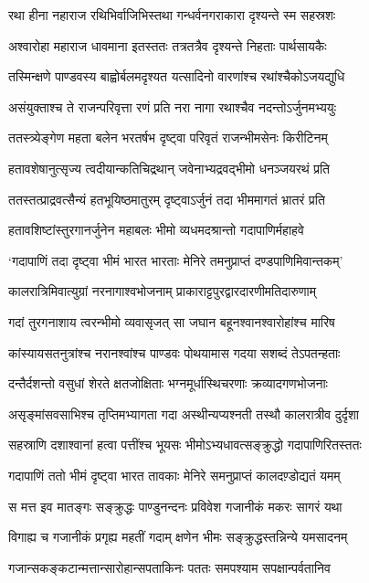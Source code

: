 \twolineshloka
{रथा हीना नहाराज रथिभिर्वाजिभिस्तथा}
{गन्धर्वनगराकारा दृश्यन्ते स्म सहस्रशः}


\twolineshloka
{अश्वारोहा महाराज धावमाना इतस्ततः}
{तत्रतत्रैव दृश्यन्ते निहताः पार्थसायकैः}


\twolineshloka
{तस्मिन्क्षणे पाण्डवस्य बाह्वोर्बलमदृश्यत}
{यत्सादिनो वारणांश्च रथांश्चैकोऽजयद्युधि}


\twolineshloka
{असंयुक्ताश्च ते राजन्परिवृत्ता रणं प्रति}
{नरा नागा रथाश्चैव नदन्तोऽर्जुनमभ्ययुः}


\twolineshloka
{ततस्त्र्येङ्गेण महता बलेन भरतर्षभ}
{दृष्ट्वा परिवृतं राजन्भीमसेनः किरीटिनम्}


\twolineshloka
{हतावशेषानुत्सृज्य त्वदीयान्कतिचिद्रथान्}
{जवेनाभ्यद्रवद्भीमो धनञ्जयरथं प्रति}


\twolineshloka
{ततस्तत्प्राद्रवत्सैन्यं हतभूयिष्ठमातुरम्}
{दृष्ट्वाऽर्जुनं तदा भीममागतं भ्रातरं प्रति}


\twolineshloka
{हतावशिष्टांस्तुरगानर्जुनेन महाबलः}
{भीमो व्यधमदश्रान्तो गदापाणिर्महाहवे}


\twolineshloka
{`गदापाणिं तदा दृष्ट्वा भीमं भारत भारताः}
{मेनिरे तमनुप्राप्तं दण्डपाणिमिवान्तकम्'}


\twolineshloka
{कालरात्रिमिवात्युग्रां नरनागाश्वभोजनाम्}
{प्राकाराट्टपुरद्वारदारणीमतिदारुणाम्}


\twolineshloka
{गदां तुरगनाशाय त्वरन्भीमो व्यवासृजत्}
{सा जघान बहूनश्वानश्वारोहांश्च मारिष}


\twolineshloka
{कांस्यायसतनुत्रांश्च नरानश्वांश्च पाण्डवः}
{पोथयामास गदया सशब्दं तेऽपतन्हताः}


\twolineshloka
{दन्तैर्दशन्तो वसुधां शेरते क्षतजोक्षिताः}
{भग्नमूर्धास्थिचरणाः क्रव्यादगणभोजनाः}


\twolineshloka
{असृङ्मांसवसाभिश्च तृप्तिमभ्यागता गदा}
{अस्थीन्यप्यश्नती तस्थौ कालरात्रीव दुर्दृशा}


\twolineshloka
{सहस्राणि दशाश्वानां हत्वा पत्तींश्च भूयसः}
{भीमोऽभ्यधावत्सङ्क्रुद्धो गदापाणिरितस्ततः}


\twolineshloka
{गदापाणिं ततो भीमं दृष्ट्वा भारत तावकाः}
{मेनिरे समनुप्राप्तं कालदण़्डोद्यतं यमम्}


\twolineshloka
{स मत्त इव मातङ्गः सङ्क्रुद्धः पाण्डुनन्दनः}
{प्रविवेश गजानीकं मकरः सागरं यथा}


\twolineshloka
{विगाह्य च गजानीकं प्रगृह्य महतीं गदाम्}
{क्षणेन भीमः सङ्क्रुद्धस्तन्निन्ये यमसादनम्}


\twolineshloka
{गजान्सकङ्कटान्मत्तान्सारोहान्सपताकिनः}
{पततः समपश्याम सपक्षान्पर्वतानिव}



